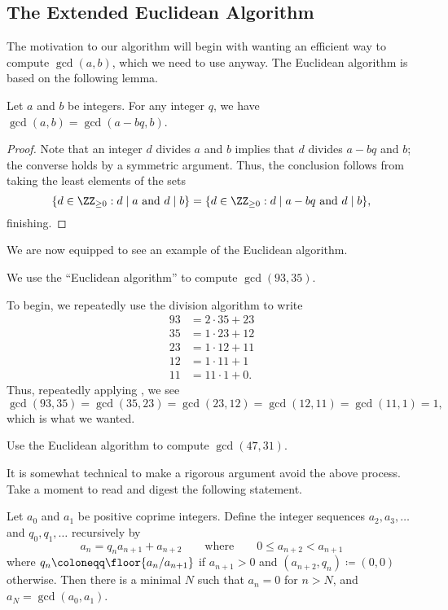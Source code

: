 \documentclass[../notes.tex]{subfiles}
\begin{document}
\subsection{The Extended Euclidean Algorithm}
The motivation to our algorithm will begin with wanting an efficient way to compute $\gcd(a,b)$, which we need to use  anyway. The Euclidean algorithm is based on the following lemma.
\begin{lemma} \label{lem:ea}
	Let $a$ and $b$ be integers. For any integer $q$, we have $\gcd(a,b)=\gcd(a-bq,b)$.
\end{lemma}
\begin{proof}
	Note that an integer $d$ divides $a$ and $b$ implies that $d$ divides $a-bq$ and $b$; the converse holds by a symmetric argument. Thus, the conclusion follows from taking the least elements of the sets
	\[\{d\in\ZZ_{\ge0}:d\mid a\text{ and }d\mid b\}=\{d\in\ZZ_{\ge0}:d\mid a-bq\text{ and }d\mid b\},\]
	finishing.
\end{proof}
We are now equipped to see an example of the Euclidean algorithm.
\begin{example} \label{ex:ea}
	We use the ``Euclidean algorithm'' to compute $\gcd(93,35)$.
\end{example}
\begin{solution}
	To begin, we repeatedly use the division algorithm to write
	\begin{align*}
		93 &= 2\cdot35+23 \\
		35 &= 1\cdot23+12 \\
		23 &= 1\cdot12+11 \\
		12 &= 1\cdot11+1 \\
		11 &= 11\cdot1+0.
	\end{align*}
	Thus, repeatedly applying , we see
	\[\gcd(93,35)=\gcd(35,23)=\gcd(23,12)=\gcd(12,11)=\gcd(11,1)=1,\]
	which is what we wanted.
\end{solution}
\begin{exe}
	Use the Euclidean algorithm to compute $\gcd(47,31)$.
\end{exe}
It is somewhat technical to make a rigorous argument avoid the above process. Take a moment to read and digest the following statement.
\begin{proposition} \label{prop:ea}
	Let $a_0$ and $a_1$ be positive coprime integers. Define the integer sequences $a_2,a_3,\ldots$ and $q_0,q_1,\ldots$ recursively by
	\[a_n=q_na_{n+1}+a_{n+2}\qquad\text{where}\qquad0\le a_{n+2}<a_{n+1}\]
	where $q_n\coloneqq\floor{a_n/a_{n+1}}$ if $a_{n+1}>0$ and $(a_{n+2},q_n)\coloneqq(0,0)$ otherwise. Then there is a minimal $N$ such that $a_n=0$ for $n>N$, and $a_N=\gcd(a_0,a_1)$.
\end{proposition}
\end{document}
